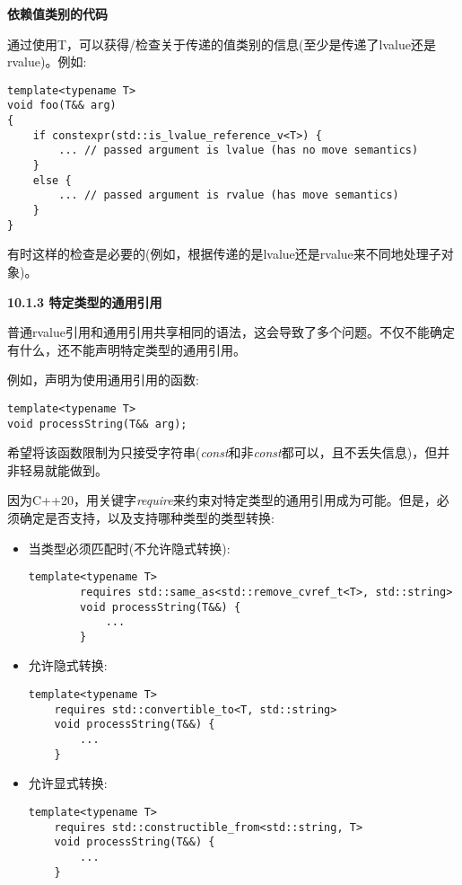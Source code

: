 \hspace*{\fill} \par %
\textbf{依赖值类别的代码}

通过使用T，可以获得/检查关于传递的值类别的信息(至少是传递了lvalue还是rvalue)。例如:\par

\begin{lstlisting}[caption={}]
template<typename T>
void foo(T&& arg)
{
	if constexpr(std::is_lvalue_reference_v<T>) {
		... // passed argument is lvalue (has no move semantics)
	}
	else {
		... // passed argument is rvalue (has move semantics)
	}
}
\end{lstlisting}

有时这样的检查是必要的(例如，根据传递的是lvalue还是rvalue来不同地处理子对象)。\par

\hspace*{\fill} \par %
\textbf{10.1.3 特定类型的通用引用}

普通rvalue引用和通用引用共享相同的语法，这会导致了多个问题。不仅不能确定有什么，还不能声明特定类型的通用引用。\par

例如，声明为使用通用引用的函数:\par

\begin{lstlisting}[caption={}]
template<typename T>
void processString(T&& arg);
\end{lstlisting}


希望将该函数限制为只接受字符串(\textit{const}和非\textit{const}都可以，且不丢失信息)，但并非轻易就能做到。\par

因为C++20，用关键字\textit{require}来约束对特定类型的通用引用成为可能。但是，必须确定是否支持，以及支持哪种类型的类型转换:\par

\begin{itemize}
	\item 当类型必须匹配时(不允许隐式转换):\par
	\begin{lstlisting}[caption={}]
		template<typename T>
		requires std::same_as<std::remove_cvref_t<T>, std::string>
		void processString(T&&) {
			...
		}
	\end{lstlisting}
	\item 允许隐式转换:\par
	\begin{lstlisting}[caption={}]
	template<typename T>
	requires std::convertible_to<T, std::string>
	void processString(T&&) {
		...
	}
	\end{lstlisting}
	\item 允许显式转换:
	\begin{lstlisting}[caption={}]
	template<typename T>
	requires std::constructible_from<std::string, T>
	void processString(T&&) {
		...
	}
	\end{lstlisting}
\end{itemize}

